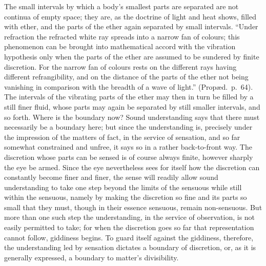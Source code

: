 \documentclass[12pt,a4paper]{book}
\begin{document}
The small intervals by which a body's smallest parts are separated are not
continua of empty space; they are, as the doctrine of light and heat shows,
filled with ether, and the parts of the ether again separated by small
intervals. ``Under refraction the refracted white ray spreads into a narrow fan
of colours; this phenomenon can be brought into mathematical accord with the
vibration hypothesis only when the parts of the ether
are assumed to be sundered by finite discretion. For the narrow fan of colours
rests on the different rays having different refrangibility, and on the
distance of the parts of the ether not being vanishing in comparison with the
breadth of a wave of light.'' (Propæd.\ p.~64). The intervals of the vibrating
parts of the ether may then in turn be filled by a still finer fluid, whose
parts may again be separated by still smaller intervals, and so forth. Where is
the boundary now? Sound understanding says that there must necessarily be a
boundary here; but since the understanding is, precisely under the impression
of the matters of fact, in the service of sensation, and so far somewhat
constrained and unfree, it says so in a rather back-to-front way. The
discretion whose parts can be sensed is of course always finite, however
sharply the eye be armed. Since the eye nevertheless sees for itself how the
discretion can constantly become finer and finer, the sense will readily allow
sound understanding to take one step beyond the limits of the sensuous while
still within the sensuous, namely by making the discretion so fine and its
parts so small that they must, though in their essence sensuous, remain
non-sensuous. But more than one such step the understanding, in the service of
observation, is not easily permitted to take; for when the discretion goes so
far that representation cannot follow, giddiness begins. To guard itself
against the giddiness, therefore, the understanding led by sensation dictates a
boundary of discretion, or, as it is generally expressed, a boundary to
matter's divisibility.
\end{document}
